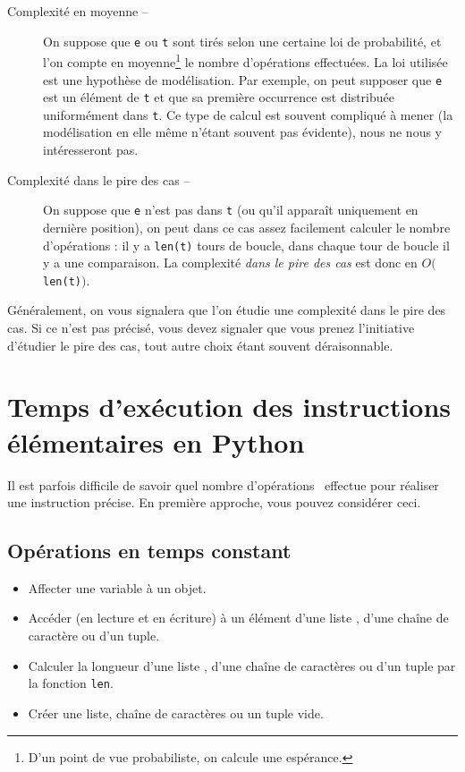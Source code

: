 \begin{description}
  \item[Complexité en moyenne --] On suppose que \texttt{e} ou \texttt{t} sont tirés selon une certaine loi 
de probabilité, et l'on compte \og en moyenne\footnote{D'un point de vue probabiliste, on calcule une 
espérance.} \fg{} le nombre d'opérations effectuées. 
    La loi utilisée est une hypothèse de modélisation. Par exemple, on peut supposer que \texttt{e} est un élément de \texttt{t} et que sa première occurrence est distribuée uniformément dans \texttt{t}. 
    Ce type de calcul est souvent compliqué à mener (la modélisation en elle même n'étant souvent pas évidente), nous ne nous y intéresseront pas. 
  \item[Complexité dans le pire des cas --] On suppose que \texttt{e} n'est pas dans \texttt{t} (ou qu'il apparaît uniquement en dernière position), on peut dans ce cas assez facilement calculer le nombre d'opérations : 
    il y a \texttt{len(t)} tours de boucle, dans chaque tour de boucle il y a une comparaison. La complexité \emph{dans le pire des cas} est donc en $O($\texttt{len(t)}$)$.
\end{description}

Généralement, on vous signalera que l'on étudie une complexité dans le pire des cas. Si ce n'est pas précisé, vous devez signaler que vous prenez l'initiative d'étudier le pire des cas, tout autre choix étant souvent déraisonnable. 

\section{Temps d'exécution des instructions élémentaires en Python}

Il est parfois difficile de savoir quel nombre d'opérations \python\ effectue pour réaliser une instruction précise. 
En première approche, vous pouvez considérer ceci.

\subsection{Opérations en temps constant}

\begin{itemize}
  \item[\textbullet] Affecter une variable à un objet.
  \item[\textbullet] Accéder (en lecture et en écriture) à un élément d'une liste \python, d'une chaîne de caractère ou d'un tuple. 
  \item[\textbullet] Calculer la longueur d'une liste \python, d'une chaîne de caractères ou d'un tuple par la fonction \texttt{len}.
  \item[\textbullet] Créer une liste, chaîne de caractères ou un tuple vide.
\end{itemize}


